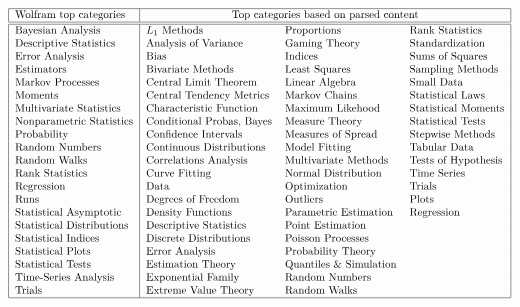 \documentclass[oneside,10pt]{book}
\begin{document}
\begin{table}[H]
\small
\[
\begin{tabular}{|l|lll|}
\hline
 Wolfram top categories &  \multicolumn{3}{c|}{Top categories based on parsed content}  \\
\hline
\hline
Bayesian Analysis	&	$L_1$ Methods	&	Proportions	&	Rank Statistics	\\
Descriptive Statistics  	&	Analysis of Variance	&	Gaming Theory	&	Standardization	\\
Error Analysis  	&	Bias	&	Indices	&	Sums of Squares	\\
Estimators 	&	Bivariate Methods	&	Least Squares	&	Sampling Methods	\\
Markov Processes 	&	Central Limit Theorem	&	Linear Algebra	&	Small Data	\\
Moments	&	Central Tendency Metrics	&	Markov Chains	&	Statistical Laws	\\
Multivariate Statistics 	&	Characteristic Function	&	Maximum Likehood	&	Statistical Moments	\\
Nonparametric Statistics  	&	Conditional Probas, Bayes	&	Measure Theory	&	Statistical Tests	\\
Probability	&	Confidence Intervals	&	Measures of Spread	&	Stepwise Methods	\\
Random Numbers	&	Continuous Distributions	&	Model Fitting	&	Tabular Data	\\
Random Walks  	&	Correlations Analysis	&	Multivariate Methods	&	Tests of Hypothesis	\\
Rank Statistics  	&	Curve Fitting	&	Normal Distribution	&	Time Series	\\
Regression  	&	Data	&	Optimization	&	Trials	\\
Runs	&	Degrees of Freedom	&	Outliers	&	Plots	\\
Statistical Asymptotic  	&	Density Functions	&	Parametric Estimation	& Regression		\\
Statistical Distributions	&	Descriptive Statistics	&	Point Estimation	&		\\
Statistical Indices 	&	Discrete Distributions	&	Poisson Processes	&		\\
Statistical Plots  	&	Error Analysis	&	Probability Theory	&		\\
Statistical Tests  	&	Estimation Theory	&	Quantiles \& Simulation	&		\\
Time-Series Analysis  	&	Exponential Family	&	Random Numbers	&		\\
Trials	&	Extreme Value Theory	&	Random Walks	&		\\

\hline
\end{tabular}
\]
\caption{\label{tabtax1} Top categories, Wolfram taxonomy (leftmost column) vs content-based}
\end{table}
\end{document}
